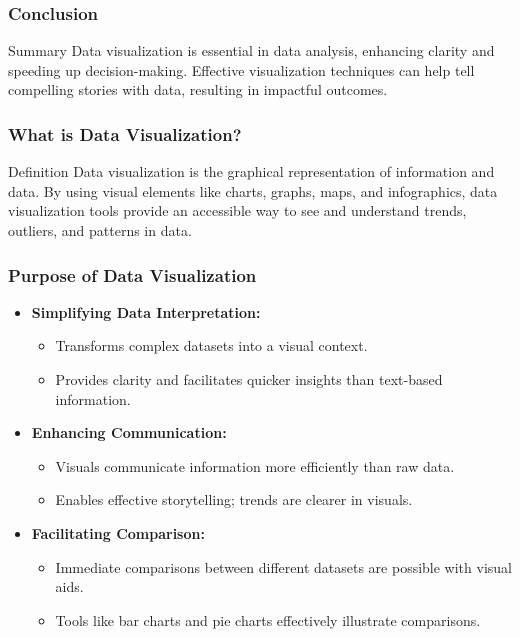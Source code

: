 \documentclass[aspectratio=169]{beamer}
\begin{document}
\begin{frame}[fragile]
    \frametitle{Conclusion}
    \begin{block}{Summary}
        Data visualization is essential in data analysis, enhancing clarity and speeding up decision-making. Effective visualization techniques can help tell compelling stories with data, resulting in impactful outcomes.
    \end{block}
\end{frame}

\begin{frame}[fragile]
    \frametitle{What is Data Visualization?}
    
    \begin{block}{Definition}
        Data visualization is the graphical representation of information and data. By using visual elements like charts, graphs, maps, and infographics, data visualization tools provide an accessible way to see and understand trends, outliers, and patterns in data.
    \end{block}
\end{frame}

\begin{frame}[fragile]
    \frametitle{Purpose of Data Visualization}

    \begin{itemize}
        \item \textbf{Simplifying Data Interpretation:}
            \begin{itemize}
                \item Transforms complex datasets into a visual context.
                \item Provides clarity and facilitates quicker insights than text-based information.
            \end{itemize}
        
        \item \textbf{Enhancing Communication:}
            \begin{itemize}
                \item Visuals communicate information more efficiently than raw data.
                \item Enables effective storytelling; trends are clearer in visuals.
            \end{itemize}

        \item \textbf{Facilitating Comparison:}
            \begin{itemize}
                \item Immediate comparisons between different datasets are possible with visual aids.
                \item Tools like bar charts and pie charts effectively illustrate comparisons.
            \end{itemize}
    \end{itemize}
\end{frame}
\end{document}
